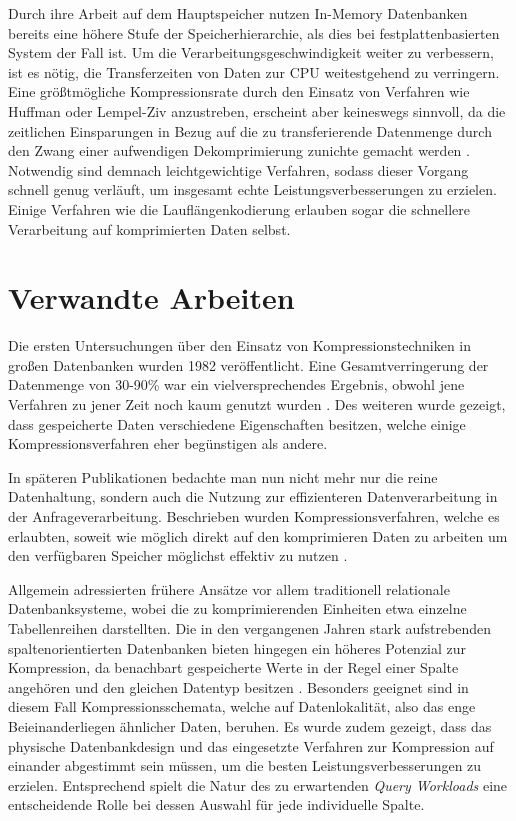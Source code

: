 Durch ihre Arbeit auf dem Hauptspeicher nutzen In-Memory Datenbanken bereits eine höhere Stufe der Speicherhierarchie, als dies bei festplattenbasierten System der Fall ist. Um die Verarbeitungsgeschwindigkeit weiter zu verbessern, ist es nötig, die Transferzeiten von Daten zur \ac{CPU} weitestgehend zu verringern. Eine größtmögliche Kompressionsrate durch den Einsatz von Verfahren wie Huffman oder Lempel-Ziv anzustreben, erscheint aber keineswegs sinnvoll, da die zeitlichen Einsparungen in Bezug auf die zu transferierende Datenmenge durch den Zwang einer aufwendigen Dekomprimierung zunichte gemacht werden \cite{Abadi2006}. Notwendig sind demnach leichtgewichtige Verfahren, sodass dieser Vorgang schnell genug verläuft, um insgesamt echte Leistungsverbesserungen zu erzielen. Einige Verfahren wie die Lauflängenkodierung erlauben sogar die schnellere Verarbeitung auf komprimierten Daten selbst.

\section{Verwandte Arbeiten}

Die ersten Untersuchungen über den Einsatz von Kompressionstechniken in großen Datenbanken wurden 1982 veröffentlicht. Eine Gesamtverringerung der Datenmenge von 30-90\% war ein vielversprechendes Ergebnis, obwohl jene Verfahren zu jener Zeit noch kaum genutzt wurden \cite{Severance1982}. Des weiteren wurde gezeigt, dass gespeicherte Daten verschiedene Eigenschaften besitzen, welche einige Kompressionsverfahren eher begünstigen als andere.

In späteren Publikationen bedachte man nun nicht mehr nur die reine Datenhaltung, sondern auch die Nutzung zur effizienteren Datenverarbeitung in der Anfrageverarbeitung. Beschrieben wurden Kompressionsverfahren, welche es erlaubten, soweit wie möglich direkt auf den komprimieren Daten zu arbeiten um den verfügbaren Speicher möglichst effektiv zu nutzen \cite{Graefe1991}.

Allgemein adressierten frühere Ansätze vor allem traditionell relationale Datenbanksysteme, wobei die zu komprimierenden Einheiten etwa einzelne Tabellenreihen darstellten. Die in den vergangenen Jahren stark aufstrebenden spaltenorientierten Datenbanken bieten hingegen ein höheres Potenzial zur Kompression, da benachbart gespeicherte Werte in der Regel einer Spalte angehören und den gleichen Datentyp besitzen \cite{Abadi2006}. Besonders geeignet sind in diesem Fall Kompressionsschemata, welche auf Datenlokalität, also das enge Beieinanderliegen ähnlicher Daten, beruhen. Es wurde zudem gezeigt, dass das physische Datenbankdesign und das eingesetzte Verfahren zur Kompression auf einander abgestimmt sein müssen, um die besten Leistungsverbesserungen zu erzielen. Entsprechend spielt die Natur des zu erwartenden \textit{Query Workloads} eine entscheidende Rolle bei dessen Auswahl für jede individuelle Spalte.

